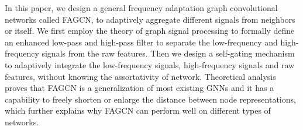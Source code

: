 \documentclass[letterpaper]{article} %
\begin{document}

In this paper, we design a general frequency adaptation graph convolutional networks called FAGCN, to adaptively aggregate different signals from neighbors or itself.
We first employ the theory of graph signal processing to formally define an enhanced low-pass and high-pass filter to separate the low-frequency and high-frequency signals from the raw features.
Then we design a self-gating mechanism to adaptively integrate the low-frequency signals, high-frequency signals and raw features, without knowing the assortativity of network.
Theoretical analysis proves that FAGCN is a generalization of most existing GNNs and it has a capability to freely shorten or enlarge the distance between node representations, which further explains why FAGCN can perform well on different types of networks.



\end{document}
